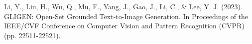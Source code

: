 \begin{thebibliography}{1}
	Li, Y., Liu, H., Wu, Q., Mu, F., Yang, J., Gao, J., Li, C., \& Lee, Y. J. (2023). GLIGEN: Open-Set Grounded Text-to-Image Generation. In Proceedings of the IEEE/CVF Conference on Computer Vision and Pattern Recognition (CVPR) (pp. 22511-22521).
\end{thebibliography}